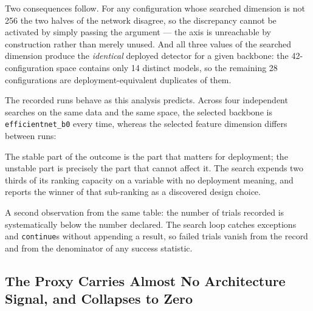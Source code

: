 Two consequences follow. For any configuration whose searched dimension is not
256 the two halves of the network disagree, so the discrepancy cannot be
activated by simply passing the argument --- the axis is unreachable by
construction rather than merely unused. And all three values of the searched
dimension produce the \emph{identical} deployed detector for a given backbone: the
42-configuration space contains only 14 distinct models, so the remaining 28
configurations are deployment-equivalent duplicates of them.

The recorded runs behave as this analysis predicts. Across four independent
searches on the same data and the same space, the selected backbone is
\texttt{efficientnet\_b0} every time, whereas the selected feature dimension
differs between runs:
%
\begin{center}

\end{center}
%
The stable part of the outcome is the part that matters for deployment; the
unstable part is precisely the part that cannot affect it. The search expends
two thirds of its ranking capacity on a variable with no deployment meaning, and
reports the winner of that sub-ranking as a discovered design choice.

A second observation from the same table: the number of trials recorded is
systematically below the number declared. The search loop catches exceptions and
\texttt{continue}s without appending a result, so failed trials vanish from the
record and from the denominator of any success statistic.

\subsection{The Proxy Carries Almost No Architecture Signal, and Collapses to Zero}
\label{subsec:proxy_stability}

